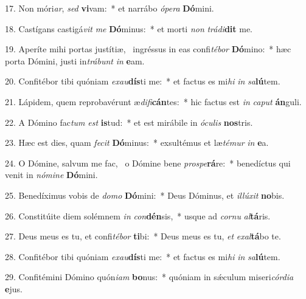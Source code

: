 17. Non móri\textit{ar}, \textit{sed} \textbf{vi}vam:~*  et narrábo \textit{ó}\textit{pe}\textit{ra} \textbf{Dó}mini.\

18. Castígans castigá\textit{vit} \textit{me} \textbf{Dó}minus:~*  et morti \textit{non} \textit{trá}\textit{di}\textbf{dit} me.\

19. Aperíte mihi portas justítiæ, \dag\  ingréssus in eas confi\textit{té}\textit{bor} \textbf{Dó}mino:~*  hæc porta Dómini, justi in\textit{trá}\textit{bunt} \textit{in} \textbf{e}am.\

20. Confitébor tibi quóniam \textit{ex}\textit{au}\textbf{dís}ti me:~*  et factus es mi\textit{hi} \textit{in} \textit{sa}\textbf{lú}tem.\

21. Lápidem, quem reprobavérunt æ\textit{di}\textit{fi}\textbf{cán}tes:~*  hic factus est \textit{in} \textit{ca}\textit{put} \textbf{án}guli.\

22. A Dómino fac\textit{tum} \textit{est} \textbf{is}tud:~*  et est mirábile in \textit{ó}\textit{cu}\textit{lis} \textbf{nos}tris.\

23. Hæc est dies, quam \textit{fe}\textit{cit} \textbf{Dó}minus:~*  exsultémus et læ\textit{té}\textit{mur} \textit{in} \textbf{e}a.\

24. O Dómine, salvum me fac, \dag\  o Dómine bene \textit{pro}\textit{spe}\textbf{rá}re:~*  benedíctus qui venit in \textit{nó}\textit{mi}\textit{ne} \textbf{Dó}mini.\

25. Benedíximus vobis de \textit{do}\textit{mo} \textbf{Dó}mini:~*  Deus Dóminus, et \textit{il}\textit{lú}\textit{xit} \textbf{no}bis.\

26. Constitúite diem solémnem \textit{in} \textit{con}\textbf{dén}sis,~*  usque ad \textit{cor}\textit{nu} \textit{al}\textbf{tá}ris.\

27. Deus meus es tu, et confi\textit{té}\textit{bor} \textbf{ti}bi:~*  Deus meus es tu, \textit{et} \textit{ex}\textit{al}\textbf{tá}bo te.\

28. Confitébor tibi quóniam \textit{ex}\textit{au}\textbf{dís}ti me:~*  et factus es mi\textit{hi} \textit{in} \textit{sa}\textbf{lú}tem.\

29. Confitémini Dómino quón\textit{i}\textit{am} \textbf{bo}nus:~*  quóniam in sǽculum miseri\textit{cór}\textit{di}\textit{a} \textbf{e}jus.\


